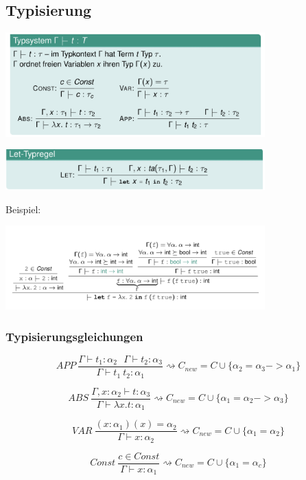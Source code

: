 \subsection{Typisierung}
\begin{center}
	\includegraphics[width=0.75\textwidth]{images/types.png}	
\end{center}
\begin{center}
		\includegraphics[width=0.75\textwidth]{images/let.png}
\end{center}
Beispiel:\\
\begin{center}
	\includegraphics[width=0.75\textwidth]{images/let_ex.png}
\end{center}
\subsubsection{Typisierungsgleichungen}
$$APP \medspace\frac{\Gamma \vdash t_1 : \alpha_2 \medspace\medspace\medspace \Gamma \vdash t_2 : \alpha_3}{\Gamma \vdash t_1 \medspace t_2 : \alpha_1} \rightsquigarrow C_{new} = C \cup \{\alpha_2 = \alpha_3 -> \alpha_1\}$$

$$ABS \medspace\frac{\Gamma, x : \alpha_2 \vdash t : \alpha_3}{\Gamma \vdash \lambda x.t:\alpha_1} \rightsquigarrow C_{new} = C \cup \{\alpha_1 = \alpha_2 -> \alpha_3\}$$

$$VAR \medspace\frac{(x: \alpha_1)(x) = \alpha_2}{\Gamma \vdash x : \alpha_2} \rightsquigarrow C_{new} = C \cup \{\alpha_1 = \alpha_2\}$$

$$Const \medspace\frac{c \in Const}{\Gamma \vdash x : \alpha_1} \rightsquigarrow C_{new} = C \cup \{\alpha_1 = \alpha_c\}$$

